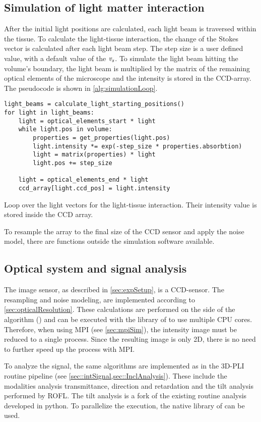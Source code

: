 \subsection{Simulation of light matter interaction}\label{sec:simLightTissue}
%
After the initial light positions are calculated, each light beam is traversed within the tissue.
To calculate the light-tissue interaction, the change of the Stokes vector is calculated after each light beam step.
The step size is a user defined value, with a default value of the \Voxelsize{} $\textnormal{$\mathit{v_{s}}$}$.
To simulate the light beam hitting the volume's boundary, the light beam is multiplied by the matrix of the remaining optical elements of the microscope and the intensity is stored in the \ac{CCD}-array.
The pseudocode is shown in \cref{alg:simulationLoop}.
%
\begin{lstfloat}[!tb]
\lstset{style=python}
\begin{lstlisting}[]
light_beams = calculate_light_starting_positions()
for light in light_beams:
    light = optical_elements_start * light
    while light.pos in volume:
        properties = get_properties(light.pos)
        light.intensity *= exp(-step_size * properties.absorbtion)
        light = matrix(properties) * light
        light.pos += step_size
    
    light = optical_elements_end * light
    ccd_array[light.ccd_pos] = light.intensity
\end{lstlisting}
\caption[]{Loop over the light vectors for the light-tissue interaction. Their intensity value is stored inside the \ac{CCD} array.}
\label{alg:simulationLoop}
\end{lstfloat}
%
To resample the array to the final size of the \ac{CCD} sensor and apply the noise model, there are \python{} functions outside the simulation software available.
%
%
%
\subsection{Optical system and signal analysis}
\label{sec:ccdOptic}
%
The image sensor, as described in \cref{sec:expSetup}, is a \ac{CCD}-sensor.
The resampling and noise modeling, are implemented according to \cref{sec:opticalResolution}.
These calculations are performed on the \python{} side of the algorithm () and can be executed with the  library of \python{} to use multiple \ac{CPU} cores.
Therefore, when using \ac{MPI} (see \cref{sec:mpiSim}), the intensity image must be reduced to a single process.
Since the resulting image is only 2D, there is no need to further speed up the process with \ac{MPI}.
\par
%
To analyze the signal, the same algorithms are implemented as in the \ac{3D-PLI} routine pipeline (see \cref{sec::intSignal,sec::InclAnalysis}).
These include the modalities analysis transmittance, direction and retardation and the tilt analysis performed by \ac{ROFL}.
The tilt analysis is a fork of the existing routine analysis developed in python.
To parallelize the execution, the native  library of \python{} can be used.
%
%
%
